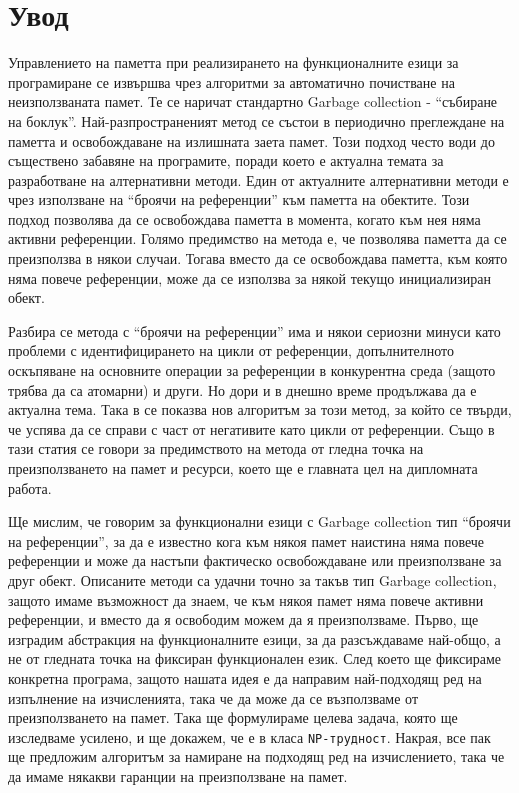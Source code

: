 \documentclass[12pt,twoside,a4paper]{article}
\begin{document}
	{
		\hypersetup{linkcolor=black}
		\tableofcontents
	}
	\clearpage
	
	\section*{Увод}
	Управлението на паметта при реализирането на функционалните езици за програмиране се извършва чрез алгоритми за автоматично почистване на неизползваната памет. Те се наричат стандартно Garbage collection - "`събиране на боклук"'. Най-разпространеният метод се състои в периодично преглеждане на паметта и освобождаване на излишната заета памет. Този подход често води до съществено забавяне на програмите, поради което е актуална темата за разработване на алтернативни методи. Един от актуалните алтернативни методи е чрез използване на "`броячи на референции"' към паметта на обектите. Този подход позволява да се освобождава паметта в момента, когато към нея няма активни референции. Голямо предимство на метода е, че позволява паметта да се преизползва в някои случаи. Тогава вместо да се освобождава паметта, към която няма повече референции, може да се използва за някой текущо инициализиран обект.
	
	Разбира се метода с "`броячи на референции"' има и някои сериозни минуси като проблеми с идентифицирането на цикли от референции, допълнителното оскъпяване на основните операции за референции в конкурентна среда (защото трябва да са атомарни) и други. Но дори и в днешно време продължава да е актуална тема. Така в \cite{perseus} се показва нов алгоритъм за този метод, за който се твърди, че успява да се справи с част от негативите като цикли от референции. Също в тази статия се говори за предимството на метода от гледна точка на преизползването на памет и ресурси, което ще е главната цел на дипломната работа.
	
	Ще мислим, че говорим за функционални езици с Garbage collection тип "`броячи на референции"', за да е известно кога към някоя памет наистина няма повече референции и може да настъпи фактическо освобождаване или преизползване за друг обект. Описаните методи са удачни точно за такъв тип Garbage collection, защото имаме възможност да знаем, че към някоя памет няма повече активни референции, и вместо да я освободим можем да я преизползваме. Първо, ще изградим абстракция на функционалните езици, за да разсъждаваме най-общо, а не от гледната точка на фиксиран функционален език. След което ще фиксираме конкретна програма, защото нашата идея е да направим най-подходящ ред на изпълнение на изчисленията, така че да може да се възползваме от преизползването на памет. Така ще формулираме целева задача, която ще изследваме усилено, и ще докажем, че е в класа \texttt{NP-трудност}. Накрая, все пак ще предложим алгоритъм за намиране на подходящ ред на изчислението, така че да имаме някакви гаранции на преизползване на памет.
	
\end{document}
